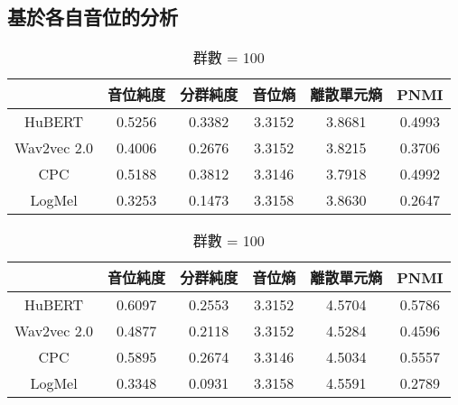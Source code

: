 \subsection{基於各自音位的分析}

        \begin{table}[!htbp]
            \centering
            \begin{subtable}[t]{\textwidth}
                \centering
                \begin{tabular}{|c|c|c|c|c|c|} \hline 
                                & 音位純度 & 分群純度 & 音位熵 & 離散單元熵 &    PNMI \\ \hline 
                    HuBERT      &   0.5256 &   0.3382 & 3.3152 &     3.8681 & 0.4993 \\ \hline    %
                    Wav2vec 2.0 &   0.4006 &   0.2676 & 3.3152 &     3.8215 & 0.3706 \\ \hline    %
                    CPC         &   0.5188 &   0.3812 & 3.3146 &     3.7918 & 0.4992 \\ \hline    %
                    LogMel      &   0.3253 &   0.1473 & 3.3158 &     3.8630 & 0.2647 \\ \hline    %
                \end{tabular}
                \caption{群數 = 50}
                \label{tab:ch3-clu050-phn}
            \end{subtable}        

            \vspace{0.5cm}        

            \begin{subtable}[t]{\textwidth}
                \centering
                \begin{tabular}{|c|c|c|c|c|c|} \hline 
                                & 音位純度 & 分群純度 & 音位熵 & 離散單元熵 &    PNMI \\ \hline 
                    HuBERT      &   0.6097 &   0.2553 & 3.3152 &     4.5704 & 0.5786 \\ \hline    %
                    Wav2vec 2.0 &   0.4877 &   0.2118 & 3.3152 &     4.5284 & 0.4596 \\ \hline    %
                    CPC         &   0.5895 &   0.2674 & 3.3146 &     4.5034 & 0.5557 \\ \hline    %
                    LogMel      &   0.3348 &   0.0931 & 3.3158 &     4.5591 & 0.2789 \\ \hline    %
                \end{tabular}
                \caption{群數 = 100}
                \label{tab:ch3-clu100-phn}
            \end{subtable}        


\end{table}

